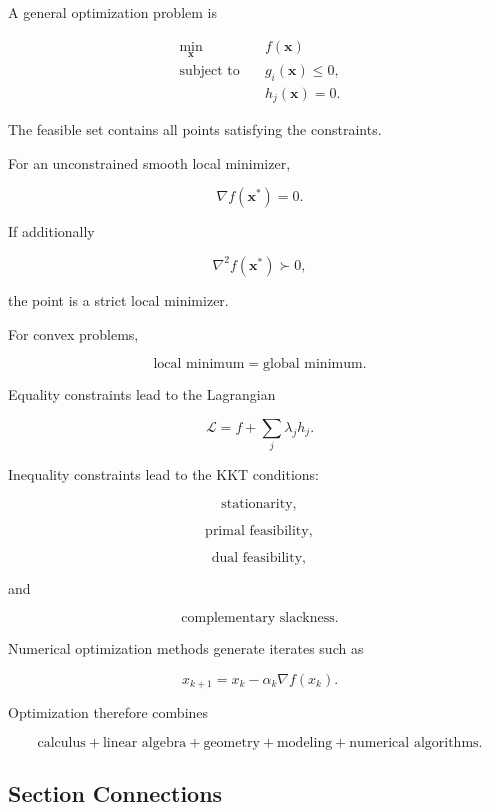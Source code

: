 A general optimization problem is

\[
\boxed{
\begin{aligned}
\min_{\mathbf{x}}
\quad&
f(\mathbf{x})
\\
\text{subject to}
\quad&
g_i(\mathbf{x})\leq0,
\\
&
h_j(\mathbf{x})=0.
\end{aligned}
}
\]

The feasible set contains all points satisfying the constraints.

For an unconstrained smooth local minimizer,

\[
\boxed{
\nabla f(\mathbf{x}^*)=0.
}
\]

If additionally

\[
\boxed{
\nabla^2f(\mathbf{x}^*)\succ0,
}
\]

the point is a strict local minimizer.

For convex problems,

\[
\boxed{
\text{local minimum}
=
\text{global minimum}.
}
\]

Equality constraints lead to the Lagrangian

\[
\boxed{
\mathcal{L}
=
f
+
\sum_j
\lambda_jh_j.
}
\]

Inequality constraints lead to the KKT conditions:

\[
\boxed{
\text{stationarity},
}
\]

\[
\boxed{
\text{primal feasibility},
}
\]

\[
\boxed{
\text{dual feasibility},
}
\]

and

\[
\boxed{
\text{complementary slackness}.
}
\]

Numerical optimization methods generate iterates such as

\[
\boxed{
x_{k+1}
=
x_k
-
\alpha_k
\nabla f(x_k).
}
\]

Optimization therefore combines

\[
\boxed{
\text{calculus}
+
\text{linear algebra}
+
\text{geometry}
+
\text{modeling}
+
\text{numerical algorithms}.
}
\]

\subsection{Section Connections}
\label{subsec:optimization-fundamentals-connections}


